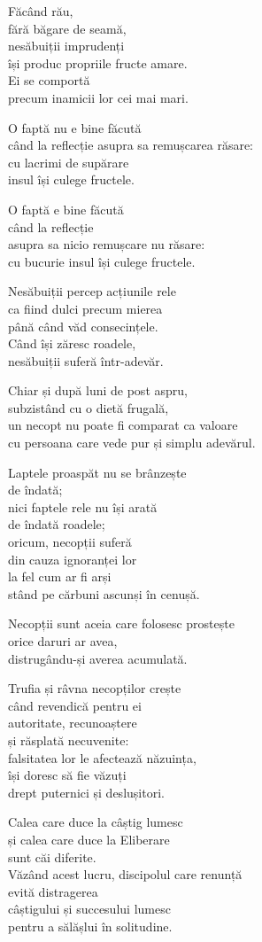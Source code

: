 Făcând rău,\\
fără băgare de seamă,\\
nesăbuiții imprudenți\\
își produc propriile fructe amare.\\
Ei se comportă\\
precum inamicii lor cei mai mari.

O faptă nu e bine făcută\\
când la reflecție asupra sa remușcarea răsare:\\
cu lacrimi de supărare\\
insul își culege fructele.


O faptă e bine făcută\\
când la reflecție\\
asupra sa nicio remușcare nu răsare:\\
cu bucurie insul își culege fructele.


Nesăbuiții percep acțiunile rele\\
ca fiind dulci precum mierea\\
până când văd consecințele.\\
Când își zăresc roadele,\\
nesăbuiții suferă într-adevăr.


Chiar și după luni de post aspru,\\
subzistând cu o dietă frugală,\\
un necopt nu poate fi comparat ca valoare\\
cu persoana care vede pur și simplu adevărul.


Laptele proaspăt nu se brânzește\\
de îndată;\\
nici faptele rele nu își arată\\
de îndată roadele;\\
oricum, necopții suferă\\
din cauza ignoranței lor\\
la fel cum ar fi arși\\
stând pe cărbuni ascunși în cenușă.


Necopții sunt aceia care folosesc prostește\\
orice daruri ar avea,\\
distrugându-și averea acumulată.


Trufia și râvna necopților crește\\
când revendică pentru ei\\
autoritate, recunoaștere\\
și răsplată necuvenite:\\
falsitatea lor le afectează năzuința,\\
își doresc să fie văzuți\\
drept puternici și deslușitori.



Calea care duce la câștig lumesc\\
și calea care duce la Eliberare\\
sunt căi diferite.\\
Văzând acest lucru, discipolul care renunță\\
evită distragerea\\
câștigului și succesului lumesc\\
pentru a sălășlui în solitudine.
